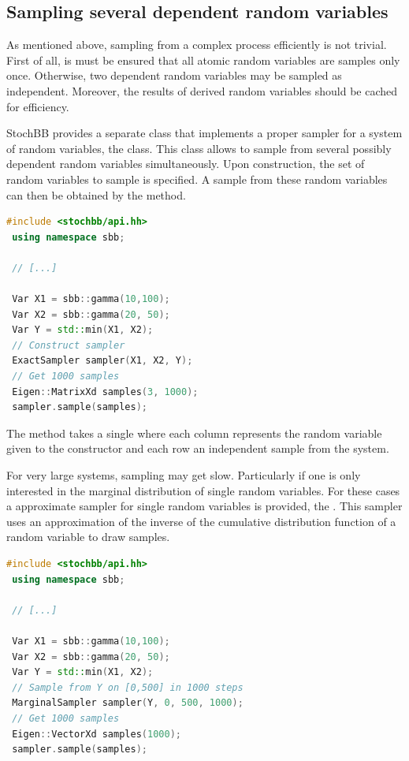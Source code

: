 \documentclass[a4paper, 10pt]{paper}
\begin{document}
\subsection{Sampling several dependent random variables}
As mentioned above, sampling from a complex process efficiently is not trivial. First of all, is
must be ensured that all atomic random variables are samples only once. Otherwise, two dependent
random variables may be sampled as independent. Moreover, the results of derived random variables
should be cached for efficiency. 

StochBB provides a separate class that implements a proper
sampler for a system of random variables, the  class. This class allows to
sample from several possibly dependent random variables simultaneously. Upon construction, the
set of random variables to sample is specified. A sample from these random variables can then be
obtained by the  method.
\begin{lstlisting}[language=C++]
 #include <stochbb/api.hh>
 using namespace sbb;

 // [...]

 Var X1 = sbb::gamma(10,100);
 Var X2 = sbb::gamma(20, 50);
 Var Y = std::min(X1, X2);
 // Construct sampler
 ExactSampler sampler(X1, X2, Y);
 // Get 1000 samples
 Eigen::MatrixXd samples(3, 1000);
 sampler.sample(samples);
\end{lstlisting}

The  method takes a single  where each column
represents the random variable given to the constructor and each row an independent sample from
the system.

For very large systems, sampling may get slow. Particularly if one is only interested
in the marginal distribution of single random variables. For these cases a approximate sampler
for single random variables is provided, the . This sampler uses an
approximation of the inverse of the cumulative distribution function of a random variable
to draw samples.
\begin{lstlisting}[language=C++]
 #include <stochbb/api.hh>
 using namespace sbb;

 // [...]

 Var X1 = sbb::gamma(10,100);
 Var X2 = sbb::gamma(20, 50);
 Var Y = std::min(X1, X2);
 // Sample from Y on [0,500] in 1000 steps
 MarginalSampler sampler(Y, 0, 500, 1000);
 // Get 1000 samples
 Eigen::VectorXd samples(1000);
 sampler.sample(samples);
\end{lstlisting}
\end{document}
